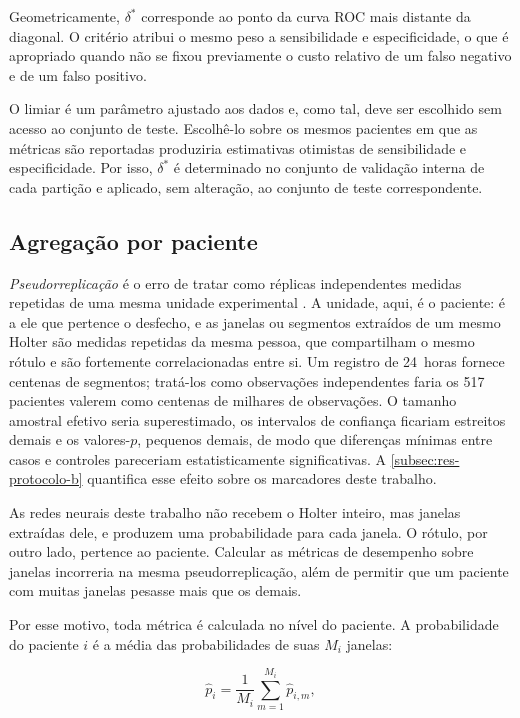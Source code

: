 \noindent
Geometricamente, $\delta^{*}$ corresponde ao ponto da curva ROC mais distante
da diagonal. O critério atribui o mesmo peso a sensibilidade e
especificidade, o que é apropriado quando não se fixou previamente o custo
relativo de um falso negativo e de um falso positivo.

O limiar é um parâmetro ajustado aos dados e, como tal, deve ser escolhido
sem acesso ao conjunto de teste. Escolhê-lo sobre os mesmos pacientes em que
as métricas são reportadas produziria estimativas otimistas de sensibilidade
e especificidade. Por isso, $\delta^{*}$ é determinado no conjunto de validação
interna de cada partição e aplicado, sem alteração, ao conjunto de teste
correspondente.

\subsection{Agregação por paciente}
\label{subsec:fund-agregacao}

\textit{Pseudorreplicação} é o erro de tratar como réplicas independentes
medidas repetidas de uma mesma unidade experimental
\cite{hurlbert1984pseudoreplication}. A unidade, aqui, é o paciente: é a ele
que pertence o desfecho, e as janelas ou segmentos extraídos de um mesmo
Holter são medidas repetidas da mesma pessoa, que compartilham o mesmo
rótulo e são fortemente correlacionadas entre si. Um registro de 24~horas
fornece centenas de segmentos; tratá-los como observações independentes faria
os 517 pacientes valerem como centenas de milhares de observações. O tamanho
amostral efetivo seria superestimado, os intervalos de confiança ficariam
estreitos demais e os valores-$p$, pequenos demais, de modo que diferenças
mínimas entre casos e controles pareceriam estatisticamente significativas.
A \autoref{subsec:res-protocolo-b} quantifica esse efeito sobre os
marcadores deste trabalho.

As redes neurais deste trabalho não recebem o Holter inteiro, mas janelas
extraídas dele, e produzem uma probabilidade para cada janela. O rótulo, por
outro lado, pertence ao paciente. Calcular as métricas de desempenho sobre
janelas incorreria na mesma pseudorreplicação, além de permitir que um
paciente com muitas janelas pesasse mais que os demais.

Por esse motivo, toda métrica é calculada no nível do paciente. A
probabilidade do paciente $i$ é a média das probabilidades de suas $M_i$
janelas:

\begin{equation}
	\hat{p}_i = \frac{1}{M_i} \sum_{m=1}^{M_i} \hat{p}_{i,m},
	\label{eq:agregacao-paciente}
\end{equation}

